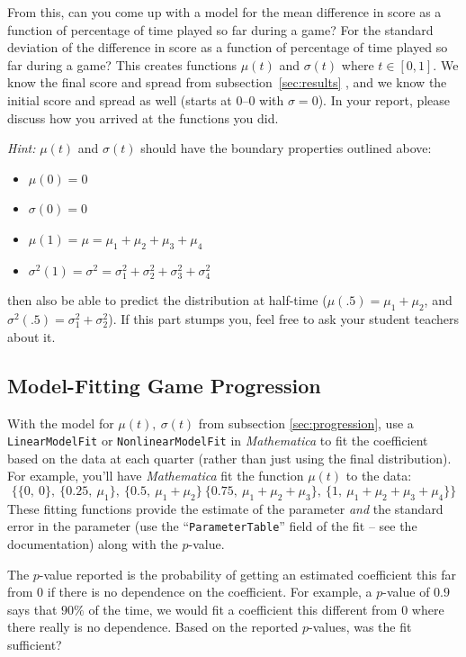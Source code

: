 \documentclass{article}
\begin{document}
From this, can you come up with a model for
the mean difference in score as a function of percentage of time played so far during a game? For the standard deviation of the difference in score as a function
of percentage of time played so far during a game? This creates functions $\mu(t)$ and $\sigma(t)$ where $t\in[0,1]$. We know the final score and spread from subsection~\ref{sec:results} ,
and we know the initial score and spread as well (starts at 0--0 with $\sigma=0$). In your report, please discuss how you arrived at the functions you did.

\textit{Hint:} $\mu(t)$ and $\sigma(t)$ should have the boundary properties outlined above: 
\begin{itemize}
\item{$\mu(0)=0$}
\item{$\sigma(0)=0$}
\item{$\mu(1)=\mu=\mu_1+\mu_2+\mu_3+\mu_4$}
\item{$\sigma^2(1)=\sigma^2=\sigma_1^2+\sigma_2^2+\sigma_3^2+\sigma_4^2$}
\end{itemize}
then also be able to predict the distribution at half-time ($\mu(.5)=\mu_1+\mu_2$, and $\sigma^2(.5)=\sigma_1^2+\sigma_2^2$). If this part stumps you, feel free to ask your student teachers about it.

\subsection{Model-Fitting Game Progression}
\label{sec:model}
With the model for $\mu(t),~\sigma(t)$ from subsection \ref{sec:progression}, use a \texttt{LinearModelFit} or \texttt{NonlinearModelFit} in \textit{Mathematica}
to fit the coefficient based on the data at each quarter (rather than just using the final distribution). For example, you'll have \textit{Mathematica} fit the function
$\mu(t)$ to the data:
$$\{\{0,~0\},~\{0.25,~\mu_1\},~\{0.5,~\mu_1+\mu_2\}~\{0.75,~\mu_1+\mu_2+\mu_3\},~\{1,~\mu_1+\mu_2+\mu_3+\mu_4\}\}$$
These fitting functions provide the estimate of the parameter \textit{and} the standard error in the parameter (use the 
``\texttt{ParameterTable}'' field of the fit -- see the documentation) along with the $p$-value. 

The $p$-value reported is the probability of getting an estimated
coefficient this far from $0$ if there is no dependence on the coefficient. For example, a $p$-value of $0.9$ says that $90\%$ of the time, we would fit a coefficient
this different from 0 where there really is no dependence. Based on the reported $p$-values, was the fit sufficient?
\end{document}
